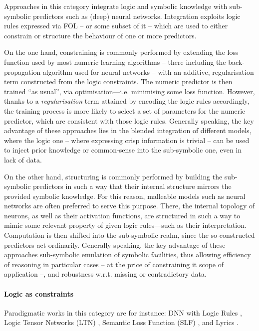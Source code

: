 \documentclass[12pt,a4paper,openright,twoside]{book}
\begin{document}
Approaches in this category integrate logic and symbolic knowledge with sub-symbolic predictors such as (deep) neural networks.
%
Integration exploits logic rules expressed via FOL -- or some subset of it -- which are used to either constrain or structure the behaviour of one or more predictors.

On the one hand, constraining is commonly performed by extending the loss function used by most numeric learning algorithms -- there including the back-propagation algorithm used for neural networks -- with an additive, regularisation term constructed from the logic constraints.
%
The numeric predictor is then trained ``as usual'', via optimisation---i.e. minimising some loss function.
%
However, thanks to a \emph{regularisation} term attained by encoding the logic rules accordingly, the training process is more likely to select a set of parameters for the numeric predictor, which are consistent with those logic rules.
%
Generally speaking, the key advantage of these approaches lies in the blended integration of different models, where the logic one -- where expressing crisp information is trivial -- can be used to inject prior knowledge or common-sense into the sub-symbolic one, even in lack of data.

On the other hand, structuring is commonly performed by building the sub-symbolic predictors in such a way that their internal structure mirrors the provided symbolic knowledge.
%
For this reason, malleable models such as neural networks are often preferred to serve this purpose.
%
There, the internal topology of neurons, as well as their activation functions, are structured in such a way to mimic some relevant property of given logic rules---such as their interpretation.
%
Computation is then shifted into the sub-symbolic realm, since the so-constructed predictors act ordinarily.
%
Generally speaking, the key advantage of these approaches sub-symbolic emulation of symbolic facilities, thus allowing efficiency of reasoning in particular cases -- at the price of constraining it scope of application --, and robustness w.r.t. missing or contradictory data.

\paragraph{Logic as constraints}

Paradigmatic works in this category are for instance: DNN with Logic Rules \cite{hu2016}, Logic Tensor Networks (LTN) \cite{serafini2016,Serafini2017}, Semantic Loss Function (SLF) \cite{xu2018}, and Lyrics \cite{marra2019lyrics}.
\end{document}
